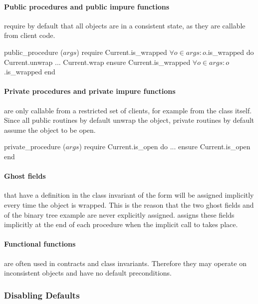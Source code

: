 \paragraph{Public procedures and public impure functions} require by default that all objects are in a consistent state, as they are callable from client code.
\begin{erunning}
public_procedure ($args$)
	require
		Current.is_wrapped
		$\forall o\in args : o$.is_wrapped
	do
		Current.unwrap
		...
		Current.wrap
	ensure
		Current.is_wrapped
		$\forall o\in args : o$.is_wrapped
	end
\end{erunning}

\paragraph{Private procedures and private impure functions} are only callable from a restricted set of clients, for example from the class itself. Since all public routines by default unwrap the  object, private routines by default assume the object to be open.
\begin{erunning}
private_procedure ($args$)
	require
		Current.is_open
	do ...
	ensure
		Current.is_open
	end
\end{erunning}

\paragraph{Ghost fields} that have a definition in the class invariant of the form  will be assigned implicitly every time the object is wrapped. This is the reason that the two ghost fields  and  of the binary tree example are never explicitly assigned. \AutoProof assigns these fields implicitly at the end of each procedure when the implicit call to  takes place.

\paragraph{Functional functions} are often used in contracts and class invariants. Therefore they may operate on inconsistent objects and have no default preconditions.

\subsubsection*{Disabling Defaults}

